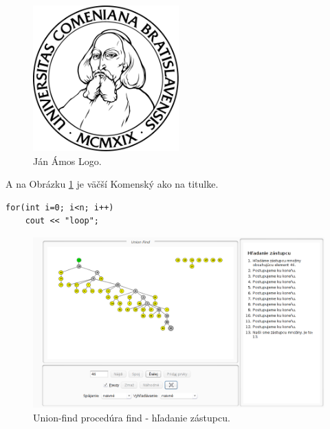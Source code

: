 \documentclass[a4paper,twoside,12pt]{book} %
\begin{document}




\begin{figure}[!hbt]
\begin{center}
\includegraphics[width=0.5\textwidth]{obrazky/komlogo-new}

\caption{Ján Ámos Logo.}
\label{img:komensky}
\end{center}
\end{figure}

A na Obrázku \ref{img:komensky} je väčší Komenský ako na titulke.

\begin{verbatim}
for(int i=0; i<n; i++)
    cout << "loop";
\end{verbatim}

\begin{figure}[!hbt]
\begin{center}
\includegraphics[width=\textwidth]{obrazky/uf00.png}

\caption{Union-find procedúra find - hľadanie zástupcu.}
\label{img:uf00}
\end{center}
\end{figure}
\end{document}
